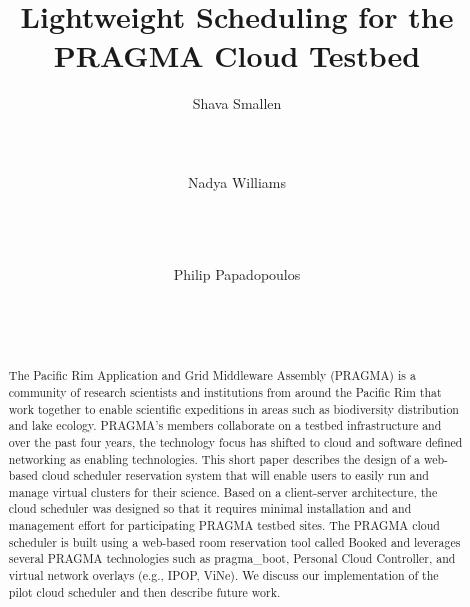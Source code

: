 \documentclass{acm_proc_article-sp}
\begin{document}
\sloppy %
\title{Lightweight Scheduling for the PRAGMA Cloud Testbed} 



\author{
\alignauthor
Shava Smallen\\
      \\
      \\
      \\
\alignauthor
Nadya Williams\\
      \\
      \\
      \\
\and %
\alignauthor Philip Papadopoulos \\
      \\
      \\
      \\
}

\maketitle
\begin{abstract}
The Pacific Rim Application and Grid Middleware Assembly (PRAGMA) is a community of research scientists and institutions from around the Pacific Rim that work together to enable scientific expeditions in areas such as biodiversity distribution and lake ecology.  PRAGMA's members collaborate on a testbed infrastructure and over the past four years, the technology focus has shifted to cloud and software defined networking as enabling technologies.  This short paper describes the design of a web-based cloud scheduler reservation system that will enable users to easily run and manage virtual clusters for their science.  Based on a client-server architecture, the cloud scheduler was designed so that it requires minimal installation and and management effort for participating PRAGMA testbed sites.   The PRAGMA cloud scheduler is built using a web-based room reservation tool called Booked and leverages several PRAGMA technologies such as pragma\_boot, Personal Cloud Controller,  and virtual network overlays (e.g., IPOP, ViNe).  We discuss our implementation of the pilot cloud scheduler and then describe future work.   
\end{abstract}
\end{document}

